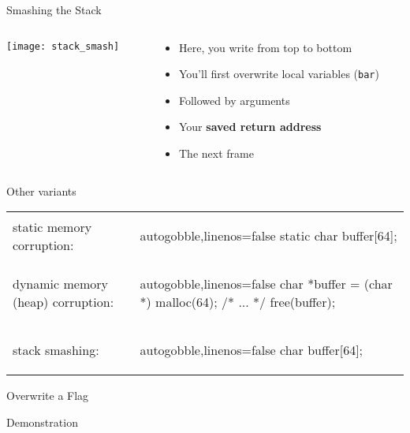 \documentclass[beamer]{uibk}
\begin{document}
\begin{frame}{Smashing the Stack}
    \begin{columns}
        \begin{column}{0.5\textwidth}
            \begin{center}
                \texttt{[image: stack\_smash]}
            \end{center}
        \end{column}
        \begin{column}{0.5\textwidth}
            \begin{itemize}
                \item Here, you write from top to bottom \bigskip
                \item You'll first overwrite local variables (\texttt{bar}) \bigskip
                \item Followed by arguments \bigskip
                \item Your \textbf{saved return address} \bigskip
                \item The next frame
            \end{itemize}
        \end{column}
    \end{columns}
\end{frame}

\begin{frame}[fragile]{Other variants}
    \begin{tabular}{p{} p{}}
        static memory corruption: &
        \begin{ccode*}{autogobble,linenos=false}
            static char buffer[64];
        \end{ccode*}
        \bigskip\\
        dynamic memory (heap) corruption: &
        \begin{ccode*}{autogobble,linenos=false}
            char *buffer = (char *) malloc(64);
            /* ... */
            free(buffer);
        \end{ccode*}
        \bigskip\\
        stack smashing: &
        \begin{ccode*}{autogobble,linenos=false}
            char buffer[64];
        \end{ccode*}
    \end{tabular}
\end{frame}

\begin{frame}{Overwrite a Flag}
    \begin{center}
        \huge Demonstration
    \end{center}
\end{frame}
\end{document}
